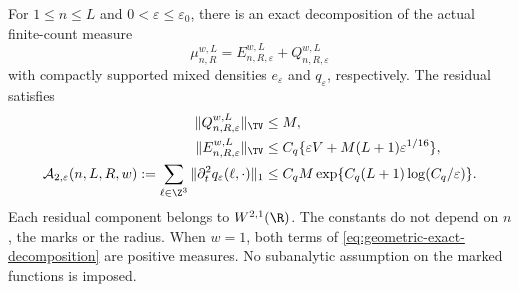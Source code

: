 \begin{theorem}
\label{thm:geometric-extraction-budget}
For $1\le n\le L$ and $0<\varepsilon\le\varepsilon_0$, there is an exact
decomposition of the actual finite-count measure
\begin{equation}\label{eq:geometric-exact-decomposition}
 \mu_{n,R}^{w,L}=E_{n,R,\varepsilon}^{w,L}
                         +Q_{n,R,\varepsilon}^{w,L}
\end{equation}
with compactly supported mixed densities $e_\varepsilon$ and
$q_\varepsilon$, respectively. The residual satisfies
\begin{align}
 \|Q_{n,R,\varepsilon}^{w,L}\|_{\TV}&\le M,\notag\\
 \|E_{n,R,\varepsilon}^{w,L}\|_{\TV}
     &\le C_q\{\varepsilon V+M(L+1)\varepsilon^{1/16}\},
                   \label{eq:geometric-extraction-mass}\\
 \mathcal A_{2,\varepsilon}(n,L,R,w)
  :=\sum_{\ell\in\Z^3}\|\partial_t^2q_\varepsilon(\ell,\cdot)\|_1
     &\le C_q M\exp\{C_q(L+1)\log(C_q/\varepsilon)\}.
                   \label{eq:geometric-derivative-budget}
\end{align}
Each residual component belongs to $W^{2,1}(\R)$. The constants do not
depend on $n$, the marks or the radius. When $w=1$, both terms of
\eqref{eq:geometric-exact-decomposition} are positive measures.
No subanalytic assumption on the marked functions is imposed.
\end{theorem}
